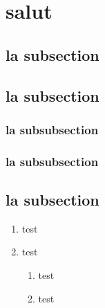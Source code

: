 \documentclass{classe-tex3R-2-1}
\begin{document}



\titreactif




\section{salut}

\subsection{la subsection}

\subsection{la subsection}

\subsubsection{la subsubsection}

\subsubsection{la subsubsection}

\subsection{la subsection}


\titreactif








\begin{enumerate}
  \item test
  \item test
  \begin{enumerate}
    \item test
    \item test
  \end{enumerate}
\end{enumerate}
\end{document}

